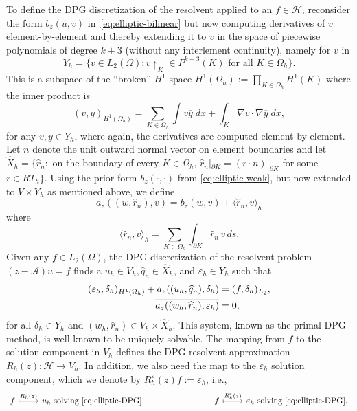 \documentclass[12pt, oneside, reqno]{amsart}
\theoremstyle{remark}
\newcommand{\tForAll}{\text{ for all }}
\renewcommand{\hat}{\widehat}
\DeclarePairedDelimiter{\parens}{(}{)}
\newcommand{\Ac}{\mathcal{A}}
\newcommand{\Hc}{\mathcal{H}}
\newcommand{\veps}{\varepsilon}
\newcommand{\om}{\Omega}
\newcommand{\ip}[1]{\langle{#1}\rangle}
\begin{document}
To define the DPG discretization of the resolvent applied to an
$f \in \Hc$, reconsider the form $b_z(u,v)$
in~\eqref{eq:elliptic-bilinear} but now  computing derivatives of $v$ element-by-element and thereby extending it  to  $v$ in the space of piecewise polynomials of degree $k+3$ (without any interlement continuity),  namely for $v$ in
\[
  Y_h = \{ v \in L_2(\om): v\restriction_K
  \in P^{k+3}(K) \tForAll K \in \Omega_h\}.
\]
This is a subspace of the ``broken'' $H^1$ space $H^1(\om_h):= \prod_{K \in \om_h} H^1(K)$ where the inner product is 
\[
  (v, y)_{H^1(\om_h)} = \sum_{K \in \om_h} \int v\overline y\; dx
  +
  \int_K \nabla v \cdot  \nabla \overline y \; dx,
\]
for any $v, y \in Y_h$, where again, the derivatives are computed
element by element.  Let $n$ denote the unit outward normal vector on
element boundaries and let $\hat X_h = \{ \hat r_n: $ on the boundary
of every $K \in \om_h$,
$\hat r_n|_{\partial K} = (r \cdot n)|_{\partial K}$ for some
$r \in RT_h\}$.  Using the prior form $b_z(\cdot, \cdot)$ from \eqref{eq:elliptic-weak}, but now
extended to $V \times Y_h$ as mentioned above, we define
\[
  a_z((w, \hat r_n), v)
  = b_z(w, v) + \ip{\hat r_n, v}_h
\]
where
\[
  \ip{ \hat r_n, v}_h = \sum_{K \in \om_h} \int_{\partial K} \hat r_n \, \overline v \, ds.
\]
Given any \(f \in L_2(\Omega)\), the DPG discretization of the
resolvent problem $(z - \Ac) u = f$ finds a
$u_h \in V_h, \hat q_n \in \hat X_h$, and \(\varepsilon_h \in Y_h\)
such that
\begin{subequations}
\label{eq:elliptic-DPG}
\begin{align}
  \parens{\varepsilon_h, \delta_h}_{H^1(\Omega_h)} +
  a_z((u_h, \hat q_n), \delta_h)
  & = (f, \delta_h)_{L_2},
  \\
  \overline{a_z((w_h, \hat r_n), \varepsilon_h)}
  & = 0,
\end{align}
\end{subequations}
for all $\delta_h \in Y_h$ and
$ (w_h, \hat r_n) \in V_h \times \hat X_h.$ This system, known as the
primal DPG method, is well known to be uniquely solvable.  The mapping from $f$ 
to the solution component in $V_h$
defines the DPG resolvent approximation $R_h (z): \Hc \to V_h$. In addition, we also need the  map to the $\varepsilon_h$ solution component, which we denote
by $R_h^\varepsilon (z) f := \varepsilon_h$, i.e.,
\[
  \begin{tikzcd}
    f %
    \ar[r, mapsto, "R_h(z)"]
    &
    {u_h\text{ solving~\eqref{eq:elliptic-DPG}}},
    &
    \qquad
    &
    f
    \ar[r, mapsto, "R^\veps_h(z)"]
    & {\veps_h \text{ solving~\eqref{eq:elliptic-DPG}}}.
  \end{tikzcd}
\]
\end{document}
